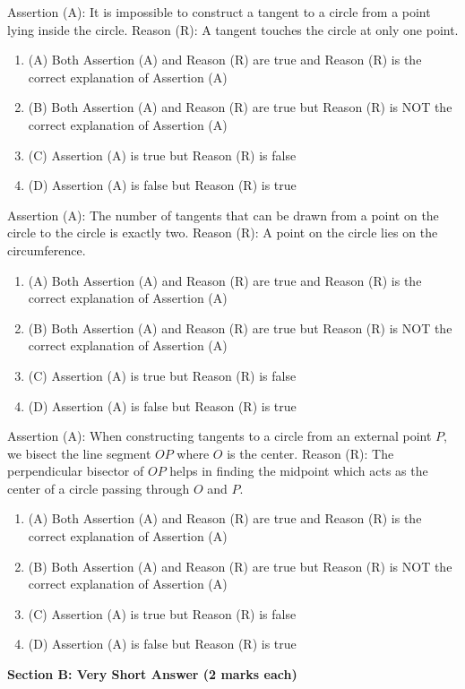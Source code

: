 \documentclass[12pt,a4paper]{exam}
\begin{document}
\begin{questions}
\question[1] Assertion (A): It is impossible to construct a tangent to a circle from a point lying inside the circle. Reason (R): A tangent touches the circle at only one point.
\begin{enumerate}[label=(\Alph*)]
  \item (A) Both Assertion (A) and Reason (R) are true and Reason (R) is the correct explanation of Assertion (A)
  \item (B) Both Assertion (A) and Reason (R) are true but Reason (R) is NOT the correct explanation of Assertion (A)
  \item (C) Assertion (A) is true but Reason (R) is false
  \item (D) Assertion (A) is false but Reason (R) is true
\end{enumerate}
\vspace{0.15cm}

\question[1] Assertion (A): The number of tangents that can be drawn from a point on the circle to the circle is exactly two. Reason (R): A point on the circle lies on the circumference.
\begin{enumerate}[label=(\Alph*)]
  \item (A) Both Assertion (A) and Reason (R) are true and Reason (R) is the correct explanation of Assertion (A)
  \item (B) Both Assertion (A) and Reason (R) are true but Reason (R) is NOT the correct explanation of Assertion (A)
  \item (C) Assertion (A) is true but Reason (R) is false
  \item (D) Assertion (A) is false but Reason (R) is true
\end{enumerate}
\vspace{0.15cm}

\question[1] Assertion (A): When constructing tangents to a circle from an external point $P$, we bisect the line segment $OP$ where $O$ is the center. Reason (R): The perpendicular bisector of $OP$ helps in finding the midpoint which acts as the center of a circle passing through $O$ and $P$.
\begin{enumerate}[label=(\Alph*)]
  \item (A) Both Assertion (A) and Reason (R) are true and Reason (R) is the correct explanation of Assertion (A)
  \item (B) Both Assertion (A) and Reason (R) are true but Reason (R) is NOT the correct explanation of Assertion (A)
  \item (C) Assertion (A) is true but Reason (R) is false
  \item (D) Assertion (A) is false but Reason (R) is true
\end{enumerate}
\vspace{0.15cm}

\end{questions}
\bigskip
\noindent\textbf{\large Section B: Very Short Answer (2 marks each)}
\end{document}
